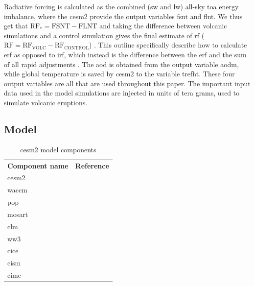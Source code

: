 \documentclass{ametsocV5}
\newcommand{\iso}[1][i]{{#1}njected \ce{SO2}}
\begin{document}

Radiative forcing is calculated as the combined (\acrshort{sw} and \acrshort{lw})
all-sky \acrshort{toa} energy imbalance, where the \acrshort{cesm2} provide the output
variables \acrfull{fsnt} and \acrfull{flnt}. We thus get that \(\mathrm{RF_*}=
\mathrm{FSNT} - \mathrm{FLNT}\) and taking the difference between volcanic simulations
and a control simulation gives the final estimate of \acrshort{rf}
(\(\mathrm{RF}=\mathrm{RF_{VOLC}}-\mathrm{RF_{CONTROL}}\)) \citep{marshall2020}. This
outline specifically describe how to calculate \acrshort{erf} as opposed to
\acrshort{irf}, which instead is the difference between the \acrshort{erf} and the sum
of all rapid adjustments \citep{marshall2020,smith2018}. The \acrshort{aod} is obtained
from the output variable \acrfull{aodm}, while global temperature is saved by
\acrshort{cesm2} to the variable \acrfull{trefht}. These four output variables are all
that are used throughout this paper. The important input data used in the model
simulations are \iso{} in units of tera grams, used to simulate volcanic eruptions.

\subsection{Model}

\begin{table}
  \caption{\acrshort{cesm2} model components}%
  \label{tab:cesm-components}
  \begin{center}
    \begin{tabular}[c]{ll}
      \multicolumn{1}{c}{\textbf{Component name}} &
      \multicolumn{1}{c}{\textbf{Reference}}                                              \\
      \acrlong{cesm2}                             & \citet{danabasoglu2020}               \\
      \acrlong{waccm}                             & \citet{gettleman2019}                 \\
      \acrlong{pop}                               & \citet{smith2010, danabasoglu2020}    \\
      \acrlong{mosart}                            & \citet{li2013, danabasoglu2020}       \\
      \acrlong{clm}                               & \citet{lawrence2019, danabasoglu2020} \\
      \acrlong{ww3}                               & \citet{danabasoglu2020}               \\
      \acrlong{cice}                              & \citet{danabasoglu2020}               \\
      \acrlong{cism}                              & \citet{danabasoglu2020}               \\
      \acrlong{cime}                              & \citet{danabasoglu2020}
    \end{tabular}
  \end{center}
\end{table}
\end{document}
